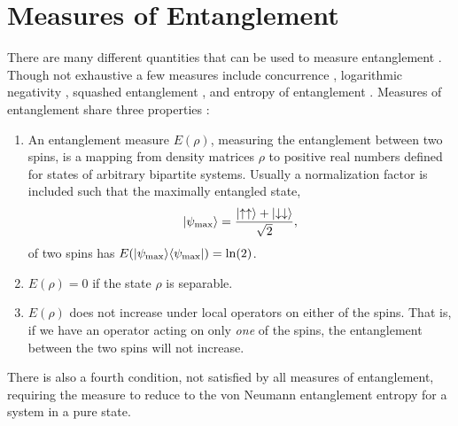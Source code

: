 \section{Measures of Entanglement}

There are many different quantities that can be used to measure entanglement . Though not exhaustive a few measures include concurrence \cite{concurrence}, logarithmic negativity \cite{negativity}, squashed entanglement \cite{squashed}, and entropy of entanglement \cite{EE}.
Measures of entanglement share three properties \cite{Plenio2005}:
\begin{enumerate}
\item An entanglement measure $E(\rho)$, measuring the entanglement between two spins, is a mapping from density matrices $\rho$ to positive real numbers defined for states of arbitrary bipartite systems.
Usually a normalization factor is included such that the maximally entangled state,
\begin{equation}
\lvert {\psi_{\rm max}} \rangle  = \frac{\lvert {\uparrow\uparrow} \rangle + \lvert {\downarrow\downarrow} \rangle}{\sqrt{2}},
\end{equation}
 of two spins has $E(\lvert {\psi_{\rm max}} \rangle\langle {\psi_{\rm max}} \rvert) = \ln(2)$.
 \item  $E(\rho)=0$ if the state $\rho$ is separable.
 \item $E(\rho)$ does not increase under local operators on either of the spins.  That is, if we have an operator acting on only {\it one} of the spins, the entanglement between the two spins will not increase.
\end{enumerate}
There is also a fourth condition, not satisfied by all measures of entanglement, requiring the measure to reduce to the von Neumann entanglement entropy for a system in a pure state.


